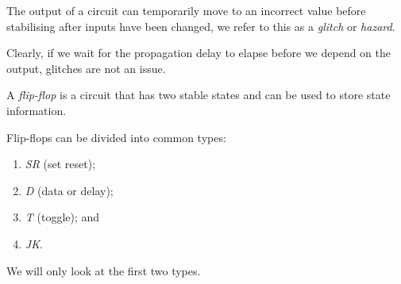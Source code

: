 \begin{definition}
	The output of a circuit can temporarily move to an incorrect value
	before stabilising after inputs have been changed, we refer to this
	as a \emph{glitch} or \emph{hazard}.
\end{definition}

Clearly, if we wait for the propagation delay to elapse before we depend on
the output, glitches are not an issue.

\begin{definition}
	A \emph{flip-flop} is a circuit that has two stable states and can be used
	to store state information.
\end{definition}

Flip-flops can be divided into common types:
\begin{enumerate}
	\item \emph{SR} (set reset);
	\item \emph{D} (data or delay);
	\item \emph{T} (toggle); and
	\item \emph{JK}.
\end{enumerate}
We will only look at the first two types.

